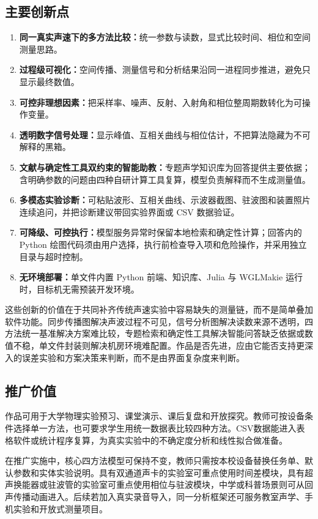 \documentclass[UTF8,a4paper,zihao=-4]{ctexart}
\begin{document}
\subsection{主要创新点}
\begin{sloppypar}
\begin{enumerate}
  \item \textbf{同一真实声速下的多方法比较：}统一参数与读数，显式比较时间、相位和空间测量思路。
  \item \textbf{过程级可视化：}空间传播、测量信号和分析结果沿同一进程同步推进，避免只显示最终数值。
  \item \textbf{可控非理想因素：}把采样率、噪声、反射、入射角和相位整周期数转化为可操作变量。
  \item \textbf{透明数字信号处理：}显示峰值、互相关曲线与相位估计，不把算法隐藏为不可解释的黑箱。
  \item \textbf{文献与确定性工具双约束的智能助教：}专题声学知识库为回答提供主要依据；含明确参数的问题由四种自研计算工具复算，模型负责解释而不生成测量值。
  \item \textbf{多模态实验诊断：}可粘贴波形、互相关曲线、示波器截图、驻波图和装置照片连续追问，并把诊断建议带回实验界面或 CSV 数据验证。
  \item \textbf{可降级、可控执行：}模型服务异常时保留本地检索和确定性计算；回答内的 Python 绘图代码须由用户选择，执行前检查导入项和危险操作，并采用独立目录与超时控制。
  \item \textbf{无环境部署：}单文件内置 Python 前端、知识库、Julia 与 WGLMakie 运行时，目标机无需预装开发环境。
\end{enumerate}
\end{sloppypar}

这些创新的价值在于共同补齐传统声速实验中容易缺失的测量链，而不是简单叠加软件功能。同步传播图解决声波过程不可见，信号分析图解决读数来源不透明，四方法统一基准解决方案难比较，专题检索和确定性工具解决智能问答缺乏依据或数值不稳，单文件封装则解决机房环境难配置。作品是否先进，应由它能否支持更深入的误差实验和方案决策来判断，而不是由界面复杂度来判断。

\subsection{推广价值}
作品可用于大学物理实验预习、课堂演示、课后复盘和开放探究。教师可按设备条件选择单一方法，也可要求学生用统一数据表比较四种方法。CSV数据能进入表格软件或统计程序复算，为真实实验中的不确定度分析和线性拟合做准备。

在推广实施中，核心四方法模型可保持不变，教师只需按本校设备替换任务单、默认参数和实体实验说明。具有双通道声卡的实验室可重点使用时间差模块，具有超声换能器或驻波管的实验室可重点使用相位与驻波模块，中学或科普场景则可从回声传播动画进入。后续若加入真实录音导入，同一分析框架还可服务教室声学、手机实验和开放式测量项目。
\end{document}
